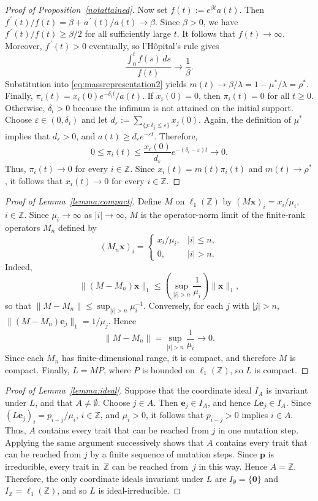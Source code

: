 \documentclass[12pt]{article}
\newcommand{\Z}{\ensuremath{\mathbb Z}}
\newcommand{\bp}{\boldsymbol{p}}
\newcommand{\be}{\boldsymbol{e}}
\newcommand{\myprime}{\,\prime}
\newcommand{\BS}{\ensuremath{\ell_1(\Z)}}
\newcommand{\bzero}{\boldsymbol{0}}
\newcommand{\bx}{\boldsymbol{x}}
\begin{document}
\begin{proof}[Proof of Proposition~\ref{notattained}]
Now set $f(t):=e^{\beta t}a(t)$. Then
$f^{\myprime}(t)/f(t)=\beta+a^{\myprime}(t)/a(t)\to\beta$. Since $\beta>0$, we have
$f^{\myprime}(t)/f(t)\geq\beta/2$ for all sufficiently large $t$. It follows
that $f(t)\to\infty$. Moreover, $f^{\myprime}(t)>0$ eventually, so
l'H{\^o}pital's rule gives
$$
\frac{\int_0^t f(s)\,ds}{f(t)} \to \frac{1}{\beta}.
$$
Substitution into \eqref{eq:massrepresentation2} yields
$m(t)\to {\beta}/{\lambda} = 1-{\mu^*}/{\lambda} = \rho^*$.
Finally,
$\pi_i(t)=x_i(0)e^{-\delta_i t}/a(t)$. If $x_i(0)=0$, then
$\pi_i(t)=0$ for all $t\geq0$. Otherwise, $\delta_i>0$ because the
infimum is not attained on the initial support. Choose
$\varepsilon\in(0,\delta_i)$ and let
$d_\varepsilon:=\sum_{\{j:\delta_j\leq\varepsilon\}}x_j(0)$.
Again, the definition of $\mu^*$ implies that $d_\varepsilon>0$, and
$a(t)\geq d_\varepsilon e^{-\varepsilon t}$. Therefore,
$$
0\leq\pi_i(t)
\leq
\frac{x_i(0)}{d_\varepsilon}
e^{-(\delta_i-\varepsilon)t}
\to 0.
$$
Thus, $\pi_i(t)\to 0$ for every $i\in\Z$. Since
$x_i(t)=m(t)\pi_i(t)$ and $m(t)\to\rho^*$, it follows that
$x_i(t)\to 0$ for every $i\in\Z$.
\end{proof}

\begin{proof}[Proof of Lemma~\ref{lemma:compact}]
Define $M$ on $\BS$ by $(M\bx)_i=x_i/\mu_i$, $i\in\Z$. Since
$\mu_i\to\infty$ as $|i|\to\infty$, $M$ is the operator-norm limit
of the finite-rank operators $M_n$ defined by
$$
(M_n\bx)_i=
\begin{cases}
x_i/\mu_i, & |i|\leq n,\\
0, & |i|>n.
\end{cases}
$$
Indeed,
$$
\|(M-M_n)\bx\|_1
\leq
\left(\sup_{|i|>n}\frac1{\mu_i}\right)\|\bx\|_1,
$$
so that $\|M-M_n\|\leq\sup_{|i|>n}\mu_i^{-1}$. Conversely, for
each $j$ with $|j|>n$,
$\|(M-M_n)\be_j\|_1=1/\mu_j$. Hence
$$
\|M-M_n\|
=
\sup_{|i|>n}\frac1{\mu_i}
\to 0.
$$
Since each $M_n$ has finite-dimensional range, it is compact, and
therefore $M$ is compact. Finally, $L=MP$, where $P$ is bounded on
$\BS$, so $L$ is compact.
\end{proof}

\begin{proof}[Proof of Lemma~\ref{lemma:ideal}]
Suppose that the coordinate ideal $I_A$ is invariant under $L$, and
that $A\neq\emptyset$. Choose $j\in A$. Then $\be_j\in I_A$, and hence
$L\be_j\in I_A$. Since
$(L\be_j)_i={p_{i-j}}/{\mu_i}$, $i\in\Z$,
and $\mu_i>0$, it follows that $p_{i-j}>0$ implies $i\in A$.
Thus, $A$ contains every trait that can be reached from $j$ in one
mutation step.
Applying the same argument successively shows that $A$ contains every
trait that can be reached from $j$ by a finite sequence of mutation
steps. Since $\bp$ is irreducible, every trait in~$\Z$ can be reached
from~$j$ in this way. Hence $A=\Z$. Therefore, the only coordinate
ideals invariant under $L$ are $I_\emptyset=\{\bzero\}$ and
$I_\Z=\BS$, and so $L$ is ideal-irreducible.
\end{proof}
\end{document}
